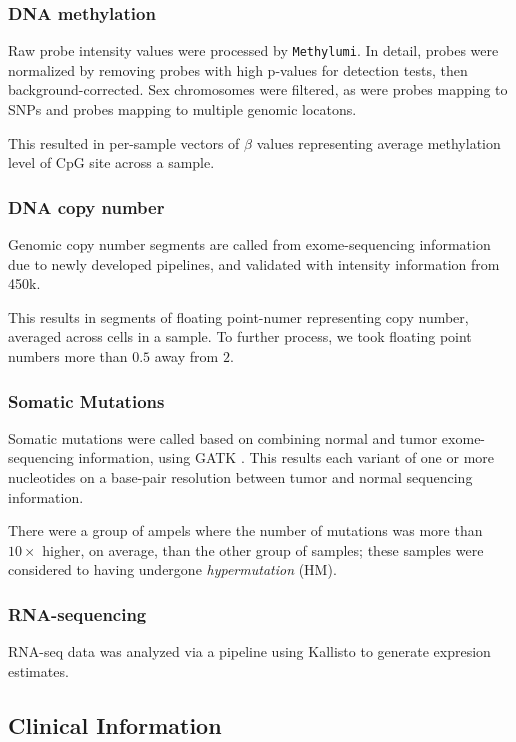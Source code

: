 \subsubsection{DNA methylation}
Raw probe intensity values were processed by
\texttt{Methylumi}\cite{davis_package_2013}. In detail, probes were
normalized by removing probes with high p-values for detection tests,
then background-corrected. Sex chromosomes were filtered, as were
probes mapping to SNPs and probes mapping to multiple genomic
locatons.

This resulted in per-sample vectors of $\beta$ values representing average methylation level
of CpG site across a sample.

\subsubsection{DNA copy number}

Genomic copy number segments are called from exome-sequencing
information due to newly developed pipelines, and validated with
intensity information from 450k.

This results in segments of floating point-numer representing copy
number, averaged across cells in a sample. To further process, we took
floating point numbers more than $0.5$ away from $2$.

\subsubsection{Somatic Mutations}

Somatic mutations were called based on combining normal and tumor
exome-sequencing information, using GATK . This results
each variant of one or more nucleotides on a base-pair resolution
between tumor and normal sequencing information.

There were a group of ampels where the number of mutations was more than $10 \times$
higher, on average, than the other group of samples; these samples
were considered to having undergone \textit{hypermutation} (HM). 

\subsubsection{RNA-sequencing}

RNA-seq data was analyzed via a pipeline using
Kallisto\cite{bray_near-optimal_2016} to generate expresion
estimates. 

\subsection{Clinical Information}

